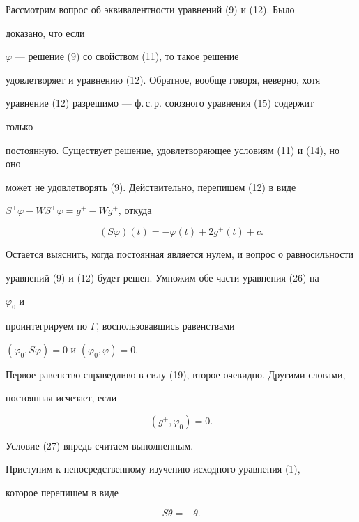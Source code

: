  


 


Рассмотрим вопрос об эквивалентности уравнений (9) и (12). Было 


доказано, что если\linebreak


$\varphi$ --- решение (9) со свойством (11), то такое решение 


удовлетворяет и уравнению (12). Обратное, вообще говоря, неверно, хотя 


уравнение (12) разрешимо --- ф.\,с.\,р. союзного уравнения (15) содержит 


только 


постоянную. Существует решение, удовлетворяющее условиям (11) и (14), но оно 


может не удовлетворять (9). Действительно, перепишем (12) в виде 


$S^+\varphi-WS^+\varphi=g^+-Wg^+$, откуда 


\begin{equation} 


(S\varphi)(t)=-\varphi(t)+2g^+(t)+c. 


\end{equation} 


Остается выяснить, когда постоянная является нулем, и вопрос о равносильности 


уравнений (9) и (12) будет решен. Умножим обе части уравнения (26) на 


$\varphi_0$ и 


проинтегрируем по $\Gamma$, воспользовавшись равенствами 


$(\varphi_0,S\varphi)=0$ и $(\varphi_0,\varphi)=0$. 


Первое равенство справедливо в силу (19), второе очевидно. Другими словами, 


постоянная исчезает, если 


\begin{equation} 


(g^+,\varphi_0)=0. 


\end{equation} 


Условие (27) впредь считаем выполненным. 


 


Приступим к непосредственному изучению исходного уравнения (1), 


которое перепишем в виде 


\begin{equation} 


S\theta=-\theta. 


\end{equation} 


